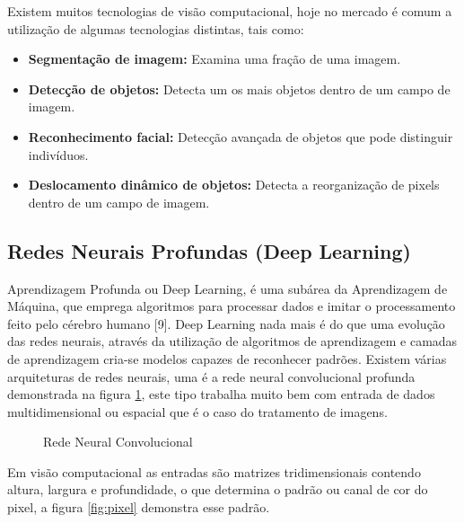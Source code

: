  Existem muitos tecnologias de visão computacional, hoje no mercado é comum a utilização de algumas tecnologias distintas, tais como:

\begin{itemize}
    \item \textbf{Segmentação de imagem:} Examina uma fração de uma imagem.
    \item \textbf{Detecção de objetos:} Detecta um os mais objetos dentro de um campo de imagem.
    \item \textbf{Reconhecimento facial:} Detecção avançada de objetos que pode distinguir indivíduos.
    \item \textbf{Deslocamento dinâmico de objetos:} Detecta a reorganização de pixels dentro de um campo de imagem.
\end{itemize}
\subsection{Redes Neurais Profundas (Deep Learning)}
Aprendizagem Profunda ou Deep Learning, é uma subárea da Aprendizagem de Máquina, que emprega algoritmos para processar dados e imitar o processamento feito pelo cérebro humano [9].
Deep Learning nada mais é do que uma evolução das redes neurais, através da utilização de algoritmos de aprendizagem e camadas de aprendizagem cria-se modelos capazes de reconhecer padrões.
Existem várias arquiteturas de redes neurais, uma é a rede neural convolucional profunda demonstrada na figura \ref{fig:neuralConv}, este tipo trabalha muito bem com entrada de dados multidimensional ou espacial que é o caso do tratamento de imagens. 

%
\begin{figure}[H]
	\centering
	\caption{Rede Neural Convolucional}
	\def\svgwidth{16cm}
	
	\label{fig:neuralConv}
\end{figure}

Em visão computacional as entradas são matrizes tridimensionais contendo altura, largura e profundidade, o que determina o padrão ou canal de cor do pixel, a figura \ref{fig:pixel} demonstra esse padrão.

